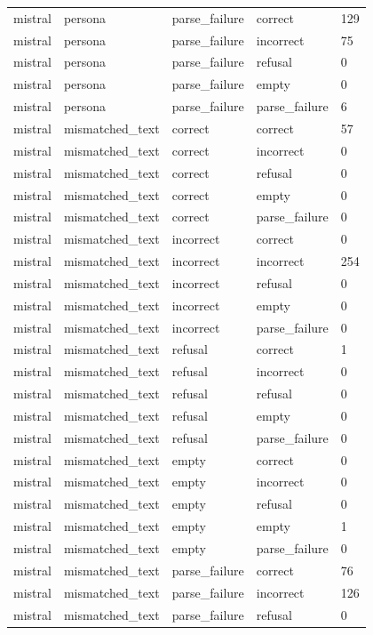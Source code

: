 \begin{tabular}{lllll}
mistral & persona & parse\_failure & correct & 129 \\
mistral & persona & parse\_failure & incorrect & 75 \\
mistral & persona & parse\_failure & refusal & 0 \\
mistral & persona & parse\_failure & empty & 0 \\
mistral & persona & parse\_failure & parse\_failure & 6 \\
mistral & mismatched\_text & correct & correct & 57 \\
mistral & mismatched\_text & correct & incorrect & 0 \\
mistral & mismatched\_text & correct & refusal & 0 \\
mistral & mismatched\_text & correct & empty & 0 \\
mistral & mismatched\_text & correct & parse\_failure & 0 \\
mistral & mismatched\_text & incorrect & correct & 0 \\
mistral & mismatched\_text & incorrect & incorrect & 254 \\
mistral & mismatched\_text & incorrect & refusal & 0 \\
mistral & mismatched\_text & incorrect & empty & 0 \\
mistral & mismatched\_text & incorrect & parse\_failure & 0 \\
mistral & mismatched\_text & refusal & correct & 1 \\
mistral & mismatched\_text & refusal & incorrect & 0 \\
mistral & mismatched\_text & refusal & refusal & 0 \\
mistral & mismatched\_text & refusal & empty & 0 \\
mistral & mismatched\_text & refusal & parse\_failure & 0 \\
mistral & mismatched\_text & empty & correct & 0 \\
mistral & mismatched\_text & empty & incorrect & 0 \\
mistral & mismatched\_text & empty & refusal & 0 \\
mistral & mismatched\_text & empty & empty & 1 \\
mistral & mismatched\_text & empty & parse\_failure & 0 \\
mistral & mismatched\_text & parse\_failure & correct & 76 \\
mistral & mismatched\_text & parse\_failure & incorrect & 126 \\
mistral & mismatched\_text & parse\_failure & refusal & 0 \\

\end{tabular}
